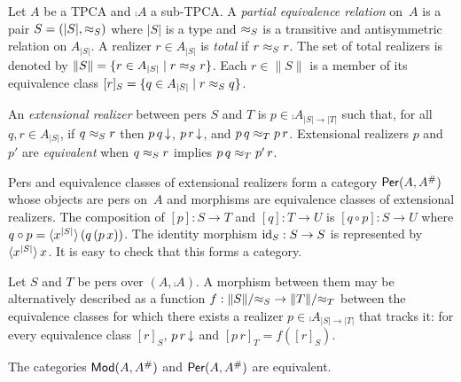 Let $A$ be a TPCA and $\comp{A}$ a sub-TPCA. A \emph{partial
  equivalence relation} on~$A$ is a pair $S = (|S|, {\approx_S})$ where
$|S|$ is a type and $\approx_S$ is a transitive and antisymmetric
relation on $A_{|S|}$. A realizer $r \in A_{|S|}$ is \emph{total} if
$r \approx_S r$. The set of total realizers is denoted by $\|S\| = \{r
  \in A_{|S|} \mid r \approx_S r\}$. Each $r \in \|S\|$ is a member of
its equivalence class $[r]_S = \{q \in A_{|S|} \mid r \approx_S q\}$.

An \emph{extensional realizer} between pers $S$ and $T$ is $p \in
\comp{A}_{|S| \to |T|}$ such that, for all $q, r \in A_{|S|}$, if $q
\approx_S r$ then $p\,q\,{\downarrow}$, $p\,r\,{\downarrow}$, and $p\,q \approx_T
p\,r$. Extensional realizers $p$ and $p'$ are \emph{equivalent} when
$q \approx_S r$ implies $p\,q \approx_T p'\,r$.

Pers and equivalence classes of extensional realizers form a category
$\mathsf{Per}(A, A^{\#})$ whose objects are pers on~$A$ and morphisms are
equivalence classes of extensional realizers. The composition of $[p]
: S \to T$ and $[q] : T \to U$ is $[q \circ p] : S \to U$ where $q
\circ p = \langle x^{|S|} \rangle\,(q\,(p\,x))$. The identity morphism
$\mathrm{id}_S : S \to S$ is represented by $\langle x^{|S|} \rangle\,x$. It
is easy to check that this forms a category.

Let $S$ and $T$ be pers over $(A, \comp{A})$. A morphism between them
may be alternatively described as a function $f : \|S\|/{\approx_S} \to
\|T\|/{\approx_T}$ between the equivalence classes for which there exists
a realizer $p \in \comp{A}_{|S| \to |T|}$ that tracks it: for every
equivalence class $[r]_S$, $p\,r\,{\downarrow}$ and $[p\,r]_T = f([r]_S)$.

\begin{proposition}
  The categories $\mathsf{Mod}(A, A^{\#})$ and $\mathsf{Per}(A, A^{\#})$ are
  equivalent.
\end{proposition}

